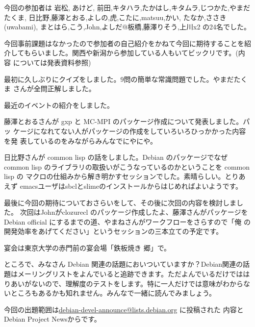 \documentclass[mingoth,a4paper]{jsarticle}
\begin{document}
今回の参加者は
岩松, あけど, 前田,キタハラ,たかはし,キタムラ,じつかた,やまだたくま,
日比野,藤澤とおる,よしの,虎,こたに,matsuu,かい,
たなか,ささき(uwabami),
まとはら,こう,John,よしだ@板橋,藤澤りそう,上川x2
の24名でした。

今回事前課題はなかったので参加者の自己紹介をかねて今回に期待することを紹
介してもらいました。関西や新潟から参加している人もいてビックリです。(内容
については発表資料参照)

最初に久しぶりにクイズをしました。9問の簡単な常識問題でした。やまだたくま
さんが全問正解しました。

最近のイベントの紹介をしました。

藤澤とおるさんが gxp と MC-MPI のパッケージ作成について発表しました。パッ
ケージになれてない人がパッケージの作成をしていろいろひっかかった内容を発
表しているのをみながらみんなでにやにや。

日比野さんが common lisp の話をしました。Debian のパッケージでなぜcommon
lisp のライブラリの取扱いがこうなっているのかということを common lisp の
マクロの仕組みから解き明かすセッションでした。素晴らしい。とりあえず
emacsユーザはsbclとslimeのインストールからはじめればよいようです。

最後に今回の期待についておさらいをして、その後に次回の内容を検討しました。
次回はJohnがclozurecl のパッケージ作成したよ、藤澤さんがパッケージを
Debian official にするまでの道、やまねさんがワークフローをさらすので「俺
の開発効率をあげてください」というセッションの三本立ての予定です。

宴会は東京大学の赤門前の宴会場「鉄板焼き 郷」で。


ところで、みなさん Debian 関連の話題においついていますか？Debian関連の話
題はメーリングリストをよんでいると追跡できます。ただよんでいるだけではは
りあいがないので、理解度のテストをします。特に一人だけでは意味がわからな
いところもあるかも知れません。みんなで一緒に読んでみましょう。

今回の出題範囲は\url{debian-devel-announce@lists.debian.org} に投稿された
内容とDebian Project Newsからです。

\begin{multicols}{2}
 
\end{multicols}

\end{document}
